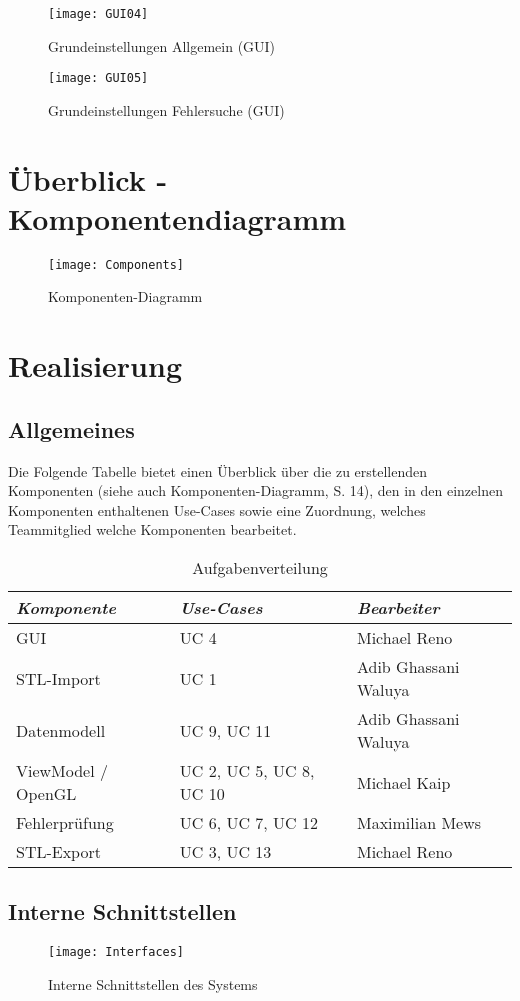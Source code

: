 \documentclass[fontsize=10pt, listof = totoc]{scrartcl}
\begin{document}
\begin{figure}[H]
\centering
\texttt{[image: GUI04]}
\caption{Grundeinstellungen Allgemein (GUI)}
\end{figure}

\begin{figure}[H]
\centering
\texttt{[image: GUI05]}
\caption{Grundeinstellungen Fehlersuche (GUI)}
\end{figure}


\section{Überblick - Komponentendiagramm}
\begin{figure}[ht]
\centering
\texttt{[image: Components]}
\caption{Komponenten-Diagramm}
\end{figure}
\newpage
\section{Realisierung}
\subsection{Allgemeines}
Die Folgende Tabelle bietet einen Überblick über die zu erstellenden Komponenten (siehe auch Komponenten-Diagramm, S. 14), den in den einzelnen Komponenten enthaltenen Use-Cases sowie eine Zuordnung, welches Teammitglied welche Komponenten bearbeitet.
\begin{table}[htbp]
\centering
\begin{tabular}{|l|l|l|}
\hline
\textit{\textbf{Komponente}} & \textit{\textbf{Use-Cases}} & \textit{\textbf{Bearbeiter}} \\ \hline
GUI & UC 4 & Michael Reno \\ \hline
STL-Import & UC 1 & Adib Ghassani Waluya \\ \hline
Datenmodell & UC 9, UC 11 & Adib Ghassani Waluya \\ \hline
ViewModel / OpenGL & UC 2, UC 5, UC 8, UC 10 & Michael Kaip \\ \hline
Fehlerprüfung & UC 6, UC 7, UC 12 & Maximilian Mews \\ \hline
STL-Export & UC 3, UC 13 & Michael Reno \\ \hline
\end{tabular}
\caption{Aufgabenverteilung}
\end{table}

\subsection{Interne Schnittstellen}
\begin{figure}[H]
\centering
\texttt{[image: Interfaces]}
\caption{Interne Schnittstellen des Systems}
\end{figure}
\end{document}
